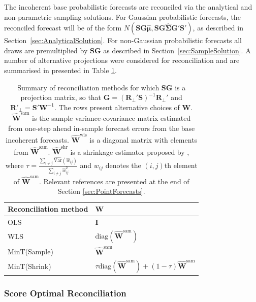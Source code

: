 \documentclass[12pt]{article}
\def\var{\text{Var}}
\theoremstyle{definition}
\begin{document}
The incoherent base probabilistic forecasts are reconciled via the analytical and non-parametric sampling solutions.  For Gaussian probabilistic forecasts, the reconciled forecast will be of the form $N(\bm{S}\bm{G}\hat{\bm{\mu}},\bm{S}\bm{G}\hat{\bm{\Sigma}}\bm{G}'\bm{S}')$, as described in Section~\ref{sec:AnalyticalSolution}.  For non-Gaussian probabilistic forecasts all draws are premultiplied by $\bm{S}\bm{G}$ as described in Section~\ref{sec:SampleSolution}.  A number of alternative projections were considered for reconciliation and are summarised in presented in Table \ref{tab:recomethods}.
\begin{table}[!t]
	\caption{Summary of reconciliation methods for which $\bm{S}\bm{G}$ is a projection matrix, so that ${\bm G}=(\bm{R}_{\perp}'\bm{S})^{-1}\bm{R}_{\perp}'$ and $\bm{R}'_\bot=\bm{S}'\bm{W}^{-1}$. The rows present alternative choices of $\bm{W}$. $\hat{\bm{W}}^{\text{sam}}$ is the sample variance-covariance matrix estimated from one-step ahead in-sample forecast errors from the base incoherent forecasts. $\hat{\bm{W}}^{\text{wls}}$ is a diagonal matrix with elements from $\hat{\bm{W}}^{\text{sam}}$. $\hat{\bm{W}}^{\text{shr}}$ is a shrinkage estimator proposed by \citet{Schafer2005},  where $\tau = \frac{\sum_{i \neq j}\hat{\var}(\hat{w}_{ij})}{\sum_{i \neq j}{\hat{w}}^2_{ij}}$ and  $w_{ij}$ denotes the $(i,j)$th element of $\hat{\bm{W}}^{\text{sam}}$. Relevant references are presented at the end of Section \ref{sec:PointForecasts}.} \label{tab:ReconMethods}
	\centering
	\begin{tabular}{l@{\hskip 0.4in}l}
		\toprule
		\textbf{Reconciliation method} & \textbf{$\bm{W}$} \\
		\midrule
		OLS             & $\bm{I}$ \\
		WLS             & $\text{diag}(\hat{\bm{W}}^{\text{sam}})$ \\
		MinT(Sample)    & $\hat{\bm{W}}^{\text{sam}}$ \\
		MinT(Shrink)    & $\tau\text{diag}(\hat{\bm{W}}^{\text{sam}}) + (1-\tau)\hat{\bm{W}}^{\text{sam}}$\\
		\bottomrule
	\end{tabular}
\label{tab:recomethods}
\end{table}

\subsubsection{Score Optimal Reconciliation}\label{sec:OptRec}
\end{document}
